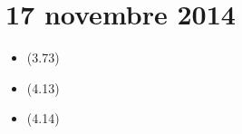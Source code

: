 \section{17 novembre 2014}

\begin{itemize}
    \item (3.73)
    \item (4.13)
    \item (4.14)
\end{itemize}
